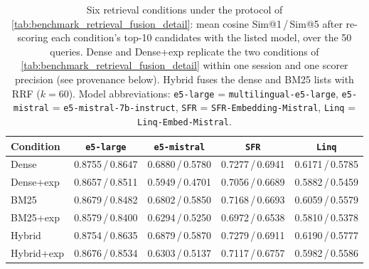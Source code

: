 \documentclass[11pt]{article}
\begin{document}
\begin{table}[t]
    \centering
    \footnotesize
    \caption{Six retrieval conditions under the protocol of \cref{tab:benchmark_retrieval_fusion_detail}: mean cosine Sim@1\,/\,Sim@5 after re-scoring each condition's top-10 candidates with the listed model, over the 50 queries. Dense and Dense+exp replicate the two conditions of \cref{tab:benchmark_retrieval_fusion_detail} within one session and one scorer precision (see provenance below). Hybrid fuses the dense and BM25 lists with RRF (\(k=60\)). Model abbreviations: \texttt{e5-large} = \texttt{multilingual-e5-large}, \texttt{e5-mistral} = \texttt{e5-mistral-7b-instruct}, \texttt{SFR} = \texttt{SFR-Embedding-Mistral}, \texttt{Linq} = \texttt{Linq-Embed-Mistral}.}
    \label{tab:app_sparse_conditions}
    \begin{tabular}{|l|cccc|}
        \hline
        Condition & \texttt{e5-large} & \texttt{e5-mistral} & \texttt{SFR} & \texttt{Linq} \\
        \hline
        Dense        & 0.8755\,/\,0.8647 & 0.6880\,/\,0.5780 & 0.7277\,/\,0.6941 & 0.6171\,/\,0.5785 \\
        Dense+exp    & 0.8657\,/\,0.8511 & 0.5949\,/\,0.4701 & 0.7056\,/\,0.6689 & 0.5882\,/\,0.5459 \\
        \hline
        BM25         & 0.8679\,/\,0.8482 & 0.6802\,/\,0.5850 & 0.7168\,/\,0.6693 & 0.6059\,/\,0.5579 \\
        BM25+exp     & 0.8579\,/\,0.8400 & 0.6294\,/\,0.5250 & 0.6972\,/\,0.6538 & 0.5810\,/\,0.5378 \\
        \hline
        Hybrid       & 0.8754\,/\,0.8635 & 0.6879\,/\,0.5870 & 0.7279\,/\,0.6911 & 0.6190\,/\,0.5777 \\
        Hybrid+exp   & 0.8676\,/\,0.8534 & 0.6303\,/\,0.5137 & 0.7117\,/\,0.6757 & 0.5982\,/\,0.5586 \\
        \hline
    \end{tabular}
\end{table}
\end{document}
